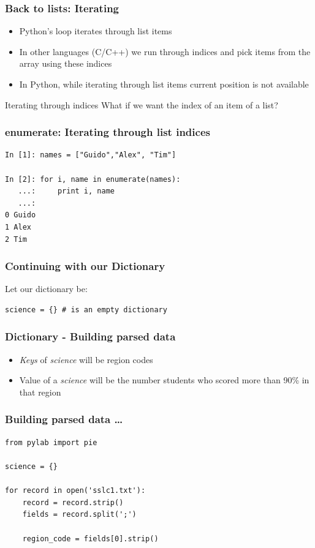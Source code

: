 \documentclass[14pt,compress]{beamer}
\newcounter{time}
\newcommand{\inctime}[1]{\addtocounter{time}{#1}{\tiny \thetime\ m}}
\newcommand{\kwrd}[1]{ \texttt{\textbf{\color{blue}{#1}}}  }
\begin{document}
\begin{frame}[fragile]
  \frametitle{Back to lists: Iterating}
  \begin{itemize}
    \item Python's \kwrd{for} loop iterates through list items
    \item In other languages (C/C++) we run through indices and pick items from the array using these indices
    \item In Python, while iterating through list items current position is not available
  \end{itemize}
  \begin{block}{Iterating through indices}
    What if we want the index of an item of a list?
  \end{block}

\end{frame}

\begin{frame}[fragile]
  \frametitle{enumerate: Iterating through list indices}
  \begin{lstlisting}
In [1]: names = ["Guido","Alex", "Tim"]

In [2]: for i, name in enumerate(names):
   ...:     print i, name
   ...: 
0 Guido
1 Alex
2 Tim
  \end{lstlisting}
  \inctime{5}
\end{frame}

\begin{frame}[fragile]
  \frametitle{Continuing with our Dictionary}
  Let our dictionary be:
  \begin{lstlisting}
science = {} # is an empty dictionary
  \end{lstlisting}
\end{frame}

\begin{frame}[fragile]
  \frametitle{Dictionary - Building parsed data}
  \begin{itemize}
    \item \emph{Keys} of \emph{science} will be region codes
    \item Value of a \emph{science} will be the number students who scored more than 90\% in that region
  \end{itemize}
\end{frame}

\begin{frame}[fragile]
  \frametitle{Building parsed data \ldots}
  \begin{lstlisting}
from pylab import pie

science = {}

for record in open('sslc1.txt'):
    record = record.strip()
    fields = record.split(';')

    region_code = fields[0].strip()
  \end{lstlisting}
\end{frame}
\end{document}
